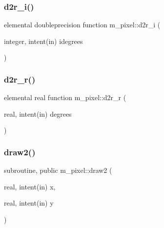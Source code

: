 \mbox{\label{namespacem__pixel_a0ac7088105ca5334d0ca3f1e4ea16d65}} 
\subsubsection{\texorpdfstring{d2r\+\_\+i()}{d2r\_i()}}
{\footnotesize\ttfamily elemental doubleprecision function m\+\_\+pixel\+::d2r\+\_\+i (\begin{DoxyParamCaption}\item[{integer, intent(in)}]{idegrees }\end{DoxyParamCaption})\hspace{0.3cm}{\ttfamily [private]}}

\mbox{\label{namespacem__pixel_af1963e62c5cc06bfb042831d1c869dc1}} 
\subsubsection{\texorpdfstring{d2r\+\_\+r()}{d2r\_r()}}
{\footnotesize\ttfamily elemental real function m\+\_\+pixel\+::d2r\+\_\+r (\begin{DoxyParamCaption}\item[{real, intent(in)}]{degrees }\end{DoxyParamCaption})\hspace{0.3cm}{\ttfamily [private]}}

\mbox{\label{namespacem__pixel_a12012e819bb14b27d2b49732aa2e4e55}} 
\subsubsection{\texorpdfstring{draw2()}{draw2()}}
{\footnotesize\ttfamily subroutine, public m\+\_\+pixel\+::draw2 (\begin{DoxyParamCaption}\item[{real, intent(in)}]{x,  }\item[{real, intent(in)}]{y }\end{DoxyParamCaption})}



